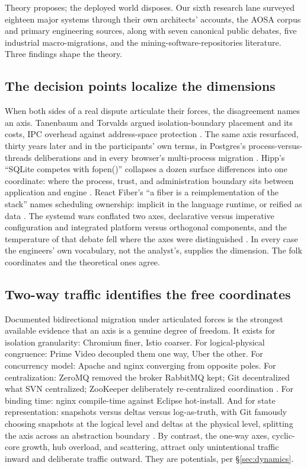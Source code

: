 \documentclass[11pt,oneside]{article}
\theoremstyle{definition}
\begin{document}
Theory proposes; the deployed world disposes. Our sixth research lane surveyed eighteen major
systems through their own architects' accounts, the AOSA corpus and primary engineering sources,
along with seven canonical public debates, five industrial macro-migrations, and the
mining-software-repositories literature. Three findings shape the theory.

\subsection{The decision points localize the dimensions}

When both sides of a real dispute articulate their forces, the disagreement names an axis.
Tanenbaum and Torvalds argued isolation-boundary placement and its costs, IPC overhead against
address-space protection \cite{tanenbaum1992}. The same axis resurfaced, thirty years later and
in the participants' own terms, in Postgres's process-versus-threads deliberations
\cite{postgres2023} and in every browser's multi-process migration \cite{chromium2009}. Hipp's
``SQLite competes with fopen()'' collapses a dozen surface differences into one coordinate:
where the process, trust, and administration boundary sits between application and engine
\cite{sqlitearch}. React Fiber's ``a fiber is a reimplementation of the stack'' names scheduling
ownership: implicit in the language runtime, or reified as data \cite{fiber2016}. The systemd
wars conflated two axes, declarative versus imperative configuration and integrated platform
versus orthogonal components, and the temperature of that debate fell where the axes were
distinguished \cite{poettering2010}. In every case the engineers' own vocabulary, not the
analyst's, supplies the dimension. The folk coordinates and the theoretical ones agree.

\subsection{Two-way traffic identifies the free coordinates}

Documented bidirectional migration under articulated forces is the strongest available evidence
that an axis is a genuine degree of freedom. It exists for isolation granularity: Chromium
finer, Istio coarser. For logical-physical congruence: Prime Video decoupled them one way, Uber
the other. For concurrency model: Apache and nginx converging from opposite poles. For
centralization: ZeroMQ removed the broker RabbitMQ kept; Git decentralized what SVN
centralized; ZooKeeper deliberately re-centralized coordination \cite{hunt2010}. For binding
time: nginx compile-time against Eclipse hot-install. And for state representation: snapshots
versus deltas versus log-as-truth, with Git famously choosing snapshots at the logical level
and deltas at the physical level, splitting the axis across an abstraction boundary
\cite{aosagit,aosazeromq,segment2018}. By contrast, the one-way axes, cyclic-core growth, hub
overload, and scattering, attract only unintentional traffic inward and deliberate traffic
outward. They are potentials, per \S\ref{sec:dynamics}.
\end{document}
